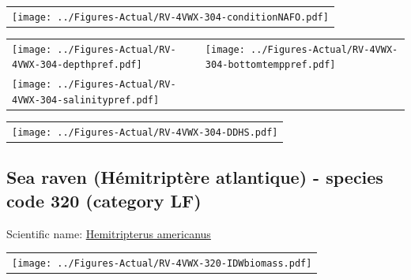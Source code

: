 \documentclass[12pt]{article}\usepackage[]{graphicx}\usepackage[]{color}
\begin{document}
\vspace{1cm}
\begin{minipage}{1.0\textwidth}
 \begin{tabular}{c}
\texttt{[image: ../Figures-Actual/RV-4VWX-304-conditionNAFO.pdf]} \\ 
\end{tabular} 
\end{minipage}
\clearpage
\begin{minipage}{1.0\textwidth}
 \begin{tabular}[t]{m{3in}m{3in}}
\texttt{[image: ../Figures-Actual/RV-4VWX-304-depthpref.pdf]} & 
\texttt{[image: ../Figures-Actual/RV-4VWX-304-bottomtemppref.pdf]} \\ 
\texttt{[image: ../Figures-Actual/RV-4VWX-304-salinitypref.pdf]} & 
 \\ 
\end{tabular} 
\end{minipage}
\newline

\vspace{1cm}
\begin{minipage}{1.0\textwidth}
 \begin{tabular}{c}
\texttt{[image: ../Figures-Actual/RV-4VWX-304-DDHS.pdf]} \\ 
\end{tabular} 
\end{minipage}
\clearpage

\renewcommand\thefigure{\thesubsection\Alph{figure}}

\setcounter{figure}{0}

\hypertarget{sec:320}{%
\subsection{Sea raven (Hémitriptère atlantique) - species code 320 (category LF)}\label{sec:320}}

  


Scientific name: \href{http://www.marinespecies.org/aphia.php?p=taxdetails\&id=159518}{Hemitripterus americanus} \newline
\begin{minipage}{1.0\textwidth}
 \begin{tabular}{c}
\texttt{[image: ../Figures-Actual/RV-4VWX-320-IDWbiomass.pdf]} \\ 
\end{tabular} 
\end{minipage}
\newline
\end{document}
